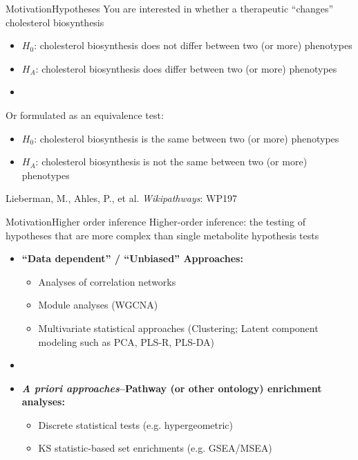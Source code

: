 \documentclass[xcolor=dvipsnames]{beamer}
\begin{document}
\begin{frame}{Motivation}{Hypotheses}
	\vspace{-10pt}
	You are interested in whether a therapeutic ``changes'' cholesterol biosynthesis
	\begin{itemize}
		\item $H_0$: cholesterol biosynthesis does not differ between two (or more) phenotypes 
		\item $H_A$: cholesterol biosynthesis does differ between two (or more) phenotypes
		\item[]
	\end{itemize} 
	
	Or formulated as an equivalence test:
	\begin{itemize}
		\item $H_0$: cholesterol biosynthesis is the same between two (or more) phenotypes 
		\item $H_A$: cholesterol biosynthesis is not the same between two (or more) phenotypes
	\end{itemize}
\end{frame}

\begin{frame}
	\begin{center}
		
		Lieberman, M., Ahles, P., et al. \emph{Wikipathways}: WP197
	\end{center}
\end{frame}

\begin{frame}{Motivation}{Higher order inference}
	\vspace{-10pt}
	{\Large Higher-order inference: the testing of hypotheses that are more complex than single metabolite hypothesis tests} \vspace{7pt}
	
	\begin{itemize}
		\item \textbf{``Data dependent'' / ``Unbiased'' Approaches:} 
		\begin{itemize}
		\item Analyses of correlation networks
		\item Module analyses (WGCNA)
		\item Multivariate statistical approaches (Clustering; Latent component modeling such as PCA, PLS-R, PLS-DA)
		\end{itemize}
		\item[]
		\item \textbf{\emph{A priori approaches}--Pathway (or other ontology) enrichment analyses:} 
		\begin{itemize}
			\item Discrete statistical tests (e.g. hypergeometric)
			\item KS statistic-based set enrichments (e.g. GSEA/MSEA)
		\end{itemize}
	\end{itemize}
	
\end{frame}
\end{document}
